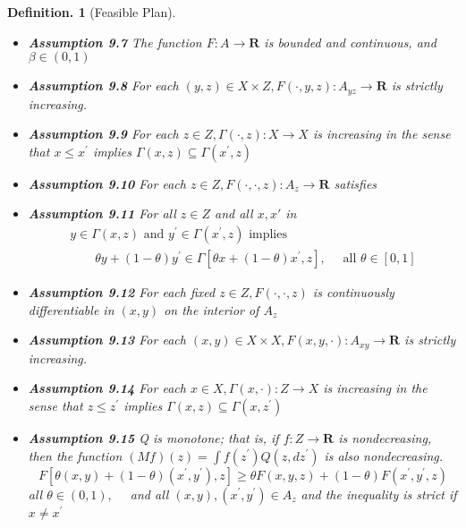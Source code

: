 \documentclass{article}
\newtheorem{defin}{Definition.}
\theoremstyle{definition}
\begin{document}
\begin{defin}[Feasible Plan]
\begin{itemize}
    \item \textbf{Assumption 9.7} The function $F: A \rightarrow \mathbf{R}$ is bounded and continuous, and $\beta \in(0,1)$
    
    \item \textbf{Assumption 9.8} For each $(y, z) \in X \times Z, F(\cdot, y, z): A_{y z} \rightarrow \mathbf{R}$ is strictly increasing.

    \item \textbf{Assumption 9.9} For each $z \in Z, \Gamma(\cdot, z): X \rightarrow X$ is increasing in the sense that $x \leq x^{\prime}$ implies $\Gamma(x, z) \subseteq \Gamma\left(x^{\prime}, z\right)$

    \item \textbf{Assumption 9.10} For each $z \in Z, F(\cdot, \cdot, z): A_{z} \rightarrow \mathbf{R}$ satisfies
    
  

    \item \textbf{Assumption 9.11} For all $z 
    \in Z$ and all $x, x'$ in 
    $$
    \begin{array}{l}
    y \in \Gamma(x, z) \text { and } y^{\prime} \in \Gamma\left(x^{\prime}, z\right) \text { implies } \\
    \qquad \theta y+(1-\theta) y^{\prime} \in \Gamma\left[\theta x+(1-\theta) x^{\prime}, z\right], \quad \text { all } \theta \in[0,1]
    \end{array}
    $$
    
    
      \item \textbf{Assumption 9.12} For each fixed $z \in Z, F(\cdot, \cdot, z)$ is continuously differentiable in $(x, y)$ on the interior of $A_{z}$

\item \textbf{Assumption 9.13}  For each $(x, y) \in X \times X, F(x, y, \cdot): A_{x y} \rightarrow \mathbf{R}$ is strictly increasing.

\item \textbf{Assumption 9.14} For each $x \in X, \Gamma(x, \cdot): Z \rightarrow X$ is increasing in the sense that $z \leq z^{\prime}$ implies $\Gamma(x, z) \subseteq \Gamma\left(x, z^{\prime}\right)$

\item \textbf{Assumption 9.15}  Q is monotone; that is, if $f: Z \rightarrow \mathbf{R}$ is nondecreasing, then the function $(M f)(z)=\int f\left(z^{\prime}\right) Q\left(z, d z^{\prime}\right)$ is also nondecreasing.
$$
F\left[\theta(x, y)+(1-\theta)\left(x^{\prime}, y^{\prime}\right), z\right] \geq \theta F(x, y, z)+(1-\theta) F\left(x^{\prime}, y^{\prime}, z\right)
$$
all $\theta \in(0,1), \quad$ and all $(x, y),\left(x^{\prime}, y^{\prime}\right) \in A_{z}$
and the inequality is strict if $x \neq x^{\prime}$


\end{itemize}
\end{defin}
\end{document}
